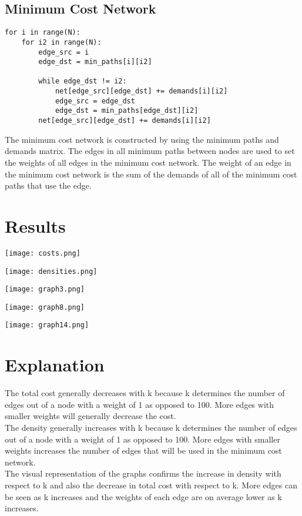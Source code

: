 \documentclass{article}
\begin{document}
\subsection{Minimum Cost Network}
\begin{verbatim}
for i in range(N):
    for i2 in range(N):
        edge_src = i
        edge_dst = min_paths[i][i2]

        while edge_dst != i2:
            net[edge_src][edge_dst] += demands[i][i2]
            edge_src = edge_dst
            edge_dst = min_paths[edge_dst][i2]
        net[edge_src][edge_dst] += demands[i][i2]
\end{verbatim}
The minimum cost network is constructed by using the minimum paths and demands matrix. The edges in all minimum paths between nodes are used to set the weights of all edges in the minimum cost network. The weight of an edge in the minimum cost network is the sum of the demands of all of the minimum cost paths that use the edge.

\section{Results}
\centerline{\texttt{[image: costs.png]}}
\centerline{\texttt{[image: densities.png]}}
\centerline{\texttt{[image: graph3.png]}}
\centerline{\texttt{[image: graph8.png]}}
\centerline{\texttt{[image: graph14.png]}}

\section{Explanation}
The total cost generally decreases with k because k determines the number of edges out of a node with a weight of 1 as opposed to 100. More edges with smaller weights will generally decrease the cost. \\

The density generally increases with k because k determines the number of edges out of a node with a weight of 1 as opposed to 100. More edges with smaller weights increases the number of edges that will be used in the minimum cost network. \\

The visual representation of the graphs confirms the increase in density with respect to k and also the decrease in total cost with respect to k. More edges can be seen as k increases and the weights of each edge are on average lower as k increases. \\
\end{document}

